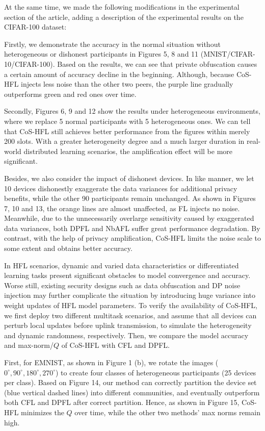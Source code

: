 \documentclass[a4paper,twoside,11pt,dvipsnames]{reviewresponse}
\begin{document}
At the same time, we made the following modifications in the experimental section of the article, adding a description of the experimental results on the CIFAR-100 dataset:


\color{blue}
Firstly, we demonstrate the accuracy in the normal situation without heterogeneous or dishonest participants in Figures 5, 8 and 11 (MNIST/CIFAR-10/CIFAR-100). Based on the results, we can see that private obfuscation causes a certain amount of accuracy decline in the beginning. Although, because CoS-HFL injects less noise than the other two peers, the purple line gradually outperforms green and red ones over time. 

Secondly, Figures 6, 9 and 12 show the results under heterogeneous environments, where we replace 5 normal participants with 5 heterogeneous ones. We can tell that CoS-HFL still achieves better performance from the figures within merely 200 slots. With a greater heterogeneity degree and a much larger duration in real-world distributed learning scenarios, the amplification effect will be more significant. 

Besides, we also consider the impact of dishonest devices. In like manner, we let 10 devices dishonestly exaggerate the data variances for additional privacy benefits, while the other 90 participants remain unchanged.  As shown in Figures 7, 10 and 13, the orange lines are almost unaffected, as FL injects no noise. Meanwhile, due to the unnecessarily overlarge sensitivity caused by exaggerated data variances, both DPFL and NbAFL suffer great performance degradation. 
By contrast, with the help of privacy amplification, CoS-HFL limits the noise scale to some extent and obtains better accuracy.

In HFL scenarios, dynamic and varied data characteristics or differentiated learning tasks present significant obstacles to model convergence and accuracy. 
Worse still, existing security designs such as data obfuscation and DP noise injection may further complicate the situation by introducing huge variance into weight updates of HFL model parameters. 
To verify the availability of CoS-HFL, we first deploy two different multitask scenarios, and assume that all devices can perturb local updates before uplink transmission, to simulate the heterogeneity and dynamic randomness, respectively. Then, we compare the model accuracy and max-norm/$Q$ of CoS-HFL with CFL and DPFL. 

First, for EMNIST, as shown in Figure 1 (b), we rotate the images ($0^{\circ},90^{\circ},180^{\circ},270^{\circ}$) to create four classes of heterogeneous participants (25 devices per class). Based on Figure 14, our method can correctly partition the device set (blue vertical dashed lines) into different communities, and eventually outperform both CFL and DPFL after correct partition. Hence, as shown in Figure 15, CoS-HFL minimizes the $Q$ over time, while the other two methods' max norms remain high.
\end{document}
